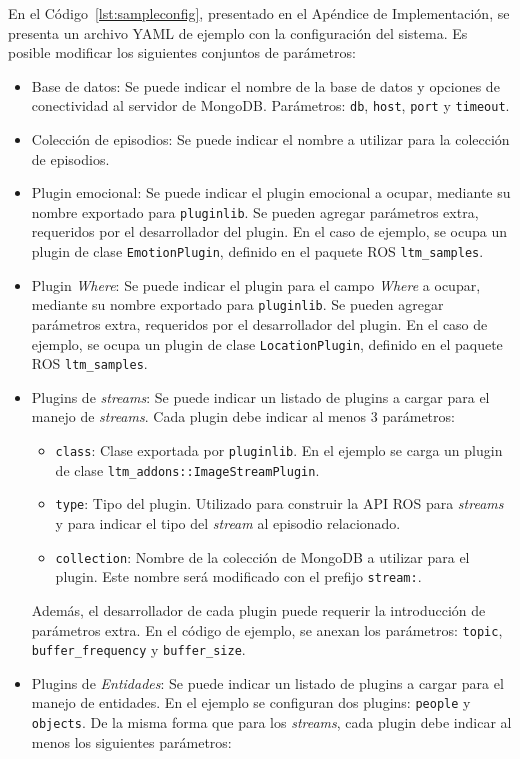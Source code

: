En el Código~\ref{lst:sampleconfig}, presentado en el Apéndice de Implementación, se presenta un archivo YAML de ejemplo con la configuración del sistema. Es posible modificar los siguientes conjuntos de parámetros:
\begin{itemize}
\item Base de datos: Se puede indicar el nombre de la base de datos y opciones de conectividad al servidor de MongoDB. Parámetros: \texttt{db}, \texttt{host}, \texttt{port} y \texttt{timeout}.
\item Colección de episodios: Se puede indicar el nombre a utilizar para la colección de episodios.
\item Plugin emocional: Se puede indicar el plugin emocional a ocupar, mediante su nombre exportado para \texttt{pluginlib}. Se pueden agregar parámetros extra, requeridos por el desarrollador del plugin. En el caso de ejemplo, se ocupa un plugin de clase \texttt{EmotionPlugin}, definido en el paquete ROS \texttt{ltm\_samples}.
\item Plugin \textit{Where}: Se puede indicar el plugin para el campo \textit{Where} a ocupar, mediante su nombre exportado para \texttt{pluginlib}. Se pueden agregar parámetros extra, requeridos por el desarrollador del plugin. En el caso de ejemplo, se ocupa un plugin de clase \texttt{LocationPlugin}, definido en el paquete ROS \texttt{ltm\_samples}.
\item Plugins de \textit{streams}: Se puede indicar un listado de plugins a cargar para el manejo de \textit{streams}. Cada plugin debe indicar al menos 3 parámetros:
\begin{itemize}
\item \texttt{class}: Clase exportada por \texttt{pluginlib}. En el ejemplo se carga un plugin de clase \texttt{ltm\_addons::ImageStreamPlugin}.
\item \texttt{type}: Tipo del plugin. Utilizado para construir la API ROS para \textit{streams} y para indicar el tipo del \textit{stream} al episodio relacionado.
\item \texttt{collection}: Nombre de la colección de MongoDB a utilizar para el plugin. Este nombre será modificado con el prefijo \texttt{stream:}.
\end{itemize}
Además, el desarrollador de cada plugin puede requerir la introducción de parámetros extra. En el código de ejemplo, se anexan los parámetros: \texttt{topic}, \texttt{buffer\_frequency} y \texttt{buffer\_size}.
\item Plugins de \textit{Entidades}: Se puede indicar un listado de plugins a cargar para el manejo de entidades. En el ejemplo se configuran dos plugins: \texttt{people} y \texttt{objects}. De la misma forma que para los \textit{streams}, cada plugin debe indicar al menos los siguientes parámetros:

\end{itemize}
